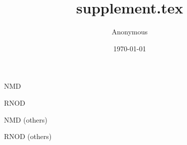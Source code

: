 \documentclass{article}
\title{supplement.tex}
\author{Anonymous}
\date{\today}
\begin{document}
\begin{table}
  \centering
  \caption{NMD}
  
\end{table}

\begin{table}
  \centering
  \caption{RNOD}
  
\end{table}

\pagebreak

\begin{table}
  \centering
  \caption{NMD (others)}
  
\end{table}

\begin{table}
  \centering
  \caption{RNOD (others)}
  
\end{table}
\end{document}
